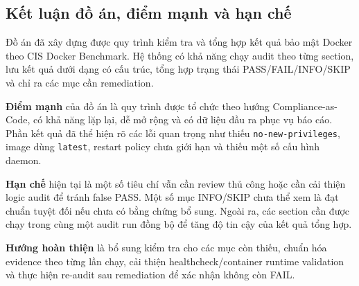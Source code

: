 \subsection{Kết luận đồ án, điểm mạnh và hạn chế}\label{ket-luan-do-an-diem-manh-yeu}

Đồ án đã xây dựng được quy trình kiểm tra và tổng hợp kết quả bảo mật Docker theo CIS Docker Benchmark. Hệ thống có khả năng chạy audit theo từng section, lưu kết quả dưới dạng có cấu trúc, tổng hợp trạng thái PASS/FAIL/INFO/SKIP và chỉ ra các mục cần remediation.

\textbf{Điểm mạnh} của đồ án là quy trình được tổ chức theo hướng Compliance-as-Code, có khả năng lặp lại, dễ mở rộng và có dữ liệu đầu ra phục vụ báo cáo. Phần kết quả đã thể hiện rõ các lỗi quan trọng như thiếu \texttt{no-new-privileges}, image dùng \texttt{latest}, restart policy chưa giới hạn và thiếu một số cấu hình daemon.

\textbf{Hạn chế} hiện tại là một số tiêu chí vẫn cần review thủ công hoặc cần cải thiện logic audit để tránh false PASS. Một số mục INFO/SKIP chưa thể xem là đạt chuẩn tuyệt đối nếu chưa có bằng chứng bổ sung. Ngoài ra, các section cần được chạy trong cùng một audit run đồng bộ để tăng độ tin cậy của kết quả tổng hợp.

\textbf{Hướng hoàn thiện} là bổ sung kiểm tra cho các mục còn thiếu, chuẩn hóa evidence theo từng lần chạy, cải thiện healthcheck/container runtime validation và thực hiện re-audit sau remediation để xác nhận không còn FAIL.
